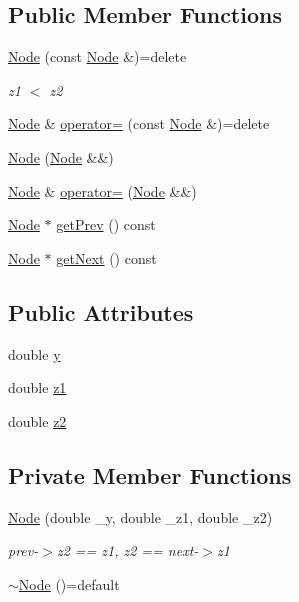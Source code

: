 \subsection*{Public Member Functions}
\begin{DoxyCompactItemize}
\item 
\hyperlink{structContourList_1_1Node_aa5a6173b45499956934fea3f0f988937}{Node} (const \hyperlink{structContourList_1_1Node}{Node} \&)=delete
\begin{DoxyCompactList}\small\item\em z1 $<$ z2 \end{DoxyCompactList}\item 
\hyperlink{structContourList_1_1Node}{Node} \& \hyperlink{structContourList_1_1Node_a034f1203c181859eff8925b7f3549f37}{operator=} (const \hyperlink{structContourList_1_1Node}{Node} \&)=delete
\item 
\hyperlink{structContourList_1_1Node_abfb23cff73a9962b3afdb1de1d6457ea}{Node} (\hyperlink{structContourList_1_1Node}{Node} \&\&)
\item 
\hyperlink{structContourList_1_1Node}{Node} \& \hyperlink{structContourList_1_1Node_abe42cd30fcddd8ba4f7a486b61f5108c}{operator=} (\hyperlink{structContourList_1_1Node}{Node} \&\&)
\item 
\hyperlink{structContourList_1_1Node}{Node} $\ast$ \hyperlink{structContourList_1_1Node_a14a3d76c3eedeb27c589d4863f618fb9}{get\+Prev} () const 
\item 
\hyperlink{structContourList_1_1Node}{Node} $\ast$ \hyperlink{structContourList_1_1Node_a1a7a77c38775ce6d5c5a55227b0d9094}{get\+Next} () const 
\end{DoxyCompactItemize}
\subsection*{Public Attributes}
\begin{DoxyCompactItemize}
\item 
double \hyperlink{structContourList_1_1Node_ac371d90797c06c6b6a6de40e21d17110}{y}
\item 
double \hyperlink{structContourList_1_1Node_acf3193319486884386610f80a4681014}{z1}
\item 
double \hyperlink{structContourList_1_1Node_a5274d7d4c01c5205fb6dec2dd0065e11}{z2}
\end{DoxyCompactItemize}
\subsection*{Private Member Functions}
\begin{DoxyCompactItemize}
\item 
\hyperlink{structContourList_1_1Node_ac4e773feed1974871bd67d8d9575d3b9}{Node} (double \+\_\+y, double \+\_\+z1, double \+\_\+z2)
\begin{DoxyCompactList}\small\item\em prev-\/$>$z2 == z1, z2 == next-\/$>$z1 \end{DoxyCompactList}\item 
\hyperlink{structContourList_1_1Node_a82678de82c1659bb2f4192e5352498b6}{$\sim$\+Node} ()=default
\end{DoxyCompactItemize}

